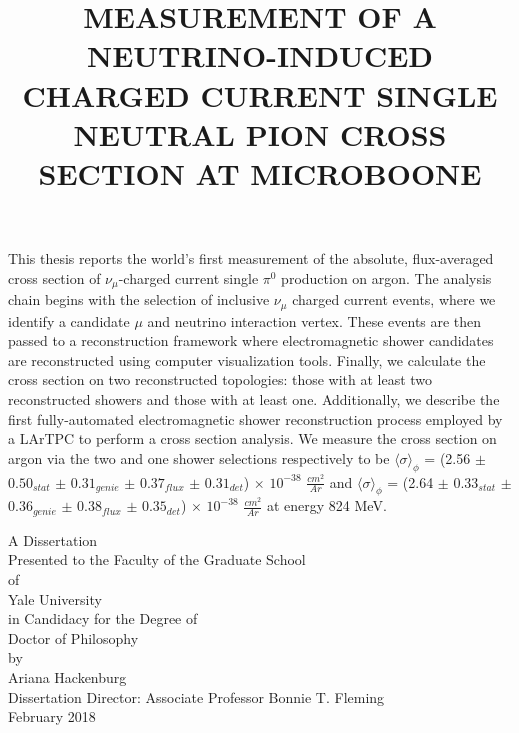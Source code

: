 This thesis reports the world's first measurement of the absolute, flux-averaged cross section of $\nu_{\mu}$-charged current single $\pi^0$ production on argon. The analysis chain begins with the selection of inclusive $\nu_\mu$ charged current events, where we identify a candidate $\mu$ and neutrino interaction vertex. These events are then passed to a reconstruction framework where electromagnetic shower candidates are reconstructed using computer visualization tools. Finally, we calculate the cross section on two reconstructed topologies: those with at least two reconstructed showers and those with at least one.  Additionally, we describe the first fully-automated electromagnetic shower reconstruction process employed by a LArTPC to perform a cross section analysis.  We measure the cross section on argon via the two and one shower selections respectively to be $\langle \sigma\rangle_{\phi}$ =
(2.56 $\pm$ $0.50_{stat}$ $\pm$ $0.31_{genie}$ $\pm$ $0.37_{flux}$ $\pm$ $0.31_{det}$) $\times$ $10^{-38}$ $\frac{cm^2}{Ar}$ and $\langle \sigma\rangle_{\phi}$ = (2.64 $\pm$ $0.33_{stat}$ $\pm$ $0.36_{genie}$ $\pm$ $0.38_{flux}$ $\pm$ $0.35_{det}$) $\times$ $10^{-38}$ $\frac{cm^2}{Ar}$ at energy 824 MeV.

\thispagestyle{empty}
\clearpage

\singlespacing
\title{MEASUREMENT OF A NEUTRINO-INDUCED CHARGED CURRENT SINGLE NEUTRAL PION CROSS SECTION AT MICROBOONE}
\date{}
\author{}
\maketitle

\vspace{4 cm}

\begin{center}
A Dissertation \\
Presented to the Faculty of the Graduate School \\
of \\
Yale University \\
in Candidacy for the Degree of \\
Doctor of Philosophy\\ 

\vspace{6 cm}
by \\
Ariana Hackenburg \\
\vspace{3 mm}
Dissertation Director: Associate Professor Bonnie T. Fleming \\
\vspace{3 mm}
February 2018 \\ 
\end{center}
\thispagestyle{empty}

